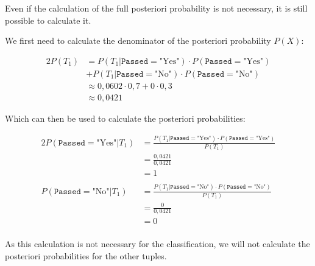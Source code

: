 \documentclass[
english,
smallborders
]{i6prcsht}
\newcommand{\BayesNumerator}[3]{P(#1 | \texttt{#2}=\text{"#3"}) \cdot P(\texttt{#2}=\text{"#3"})}
\newcommand{\PosterioriProbability}[3]{P(\texttt{#2}=\text{"#3"} | #1)}
\begin{document}
\begin{solution}
\begin{enumerate}
\begin{enumerate}
\begin{mdframed}[linecolor=solutioncolor]
\begin{em}
					            Even if the calculation of the full posteriori probability is not necessary, it is still possible to calculate it.
					            
					            We first need to calculate the denominator of the posteriori probability $P(X)$:
					            
					            \begin{alignat*}{2}
						            P(T_1) & = \BayesNumerator{T_1}{Passed}{Yes}    \\
						                   & + \BayesNumerator{T_1}{Passed}{No}     \\
						                   & \approx 0,0602 \cdot 0,7 + 0 \cdot 0,3 \\
						                   & \approx 0,0421
					            \end{alignat*}
					            
					            
					            Which can then be used to calculate the posteriori probabilities:
					            
					            \begin{alignat*}{2}
						            \PosterioriProbability{T_1}{Passed}{Yes} & = \frac{\BayesNumerator{T_1}{Passed}{Yes}}{P(T_1)} \\
						                                                     & = \frac{0,0421}{0,0421}                            \\
						                                                     & = 1                                                \\
						                                                     &                                                    \\
						            \PosterioriProbability{T_1}{Passed}{No}  & = \frac{\BayesNumerator{T_1}{Passed}{No}}{P(T_1)}  \\
						                                                     & = \frac{0}{0,0421}                                 \\
						                                                     & = 0                                                \\
					            \end{alignat*}
					            
					            As this calculation is not necessary for the classification, we will not calculate the posteriori probabilities for the other tuples.
				            \end{em}
			            \end{mdframed}
			            

\end{enumerate}
\end{enumerate}
\end{solution}
\end{document}

